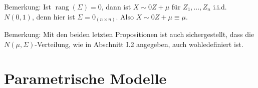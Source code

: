 \documentclass{tstextbook}
\DeclareMathOperator{\rang}{rang}
\begin{document}
\begin{remark}
	Bemerkung: Ist $ \rang(\Sigma) = 0 $, dann ist $ X\sim 0Z+\mu $ für $ Z_1,\ldots, Z_n $ i.i.d. $ N(0,1) $, denn hier ist $ \Sigma = 0_{(n\times n)} $. Also $ X \sim 0Z +\mu \equiv \mu. $
\end{remark}	

\begin{remark}
	Bemerkung: Mit den beiden letzten Propositionen ist auch sichergestellt, dass die $ N(\mu, \Sigma) $-Verteilung, wie in Abschnitt I.2 angegeben, auch wohledefiniert ist.
\end{remark}





\chapter{Parametrische Modelle}
\end{document}
